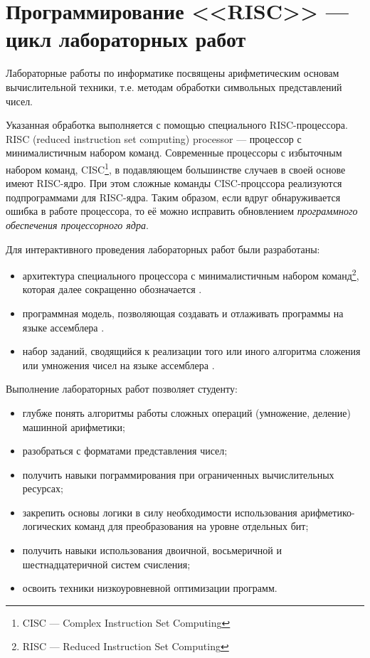 \chapter{Программирование <<RISC>> --- цикл лабораторных работ}

Лабораторные работы по информатике посвящены арифметическим основам вычислительной техники, т.е. методам обработки символьных представлений чисел.

Указанная обработка выполняется с помощью специального RISC-процессора. RISC (reduced instruction set computing) processor --- процессор с минималистичным набором команд. Современные процессоры с избыточным набором команд, CISC\footnote{CISC --- Complex Instruction Set Computing}, в подавляющем большинстве случаев в своей основе имеют RISC-ядро. При этом сложные команды CISC-процссора реализуются подпрограммами для RISC-ядра. Таким образом, если вдруг обнаруживается ошибка в работе процессора, то её можно исправить обновлением \emph{программного обеспечения процессорного ядра}.
    
Для интерактивного проведения лабораторных работ были разработаны:
\begin{itemize}
    \item архитектура специального процессора с минималистичным набором команд\footnote{RISC --- Reduced Instruction Set Computing}, которая далее сокращенно обозначается \MyProc.
    
    \item программная модель, позволяющая создавать и отлаживать программы на языке ассемблера \MyProc.
    
    \item набор заданий, сводящийся к реализации того или иного алгоритма сложения или умножения чисел на языке ассемблера \MyProc.
\end{itemize}

Выполнение лабораторных работ позволяет студенту:
\begin{itemize}
    \item глубже понять алгоритмы работы сложных операций (умножение, деление) машинной арифметики;
    
    \item разобраться с форматами представления чисел;
    
    \item получить навыки пограммирования при ограниченных вычислительных ресурсах;
    
    \item закрепить основы логики в силу необходимости использования арифметико-логических команд для преобразования на уровне отдельных бит;
    
    \item получить навыки использования двоичной, восьмеричной и шестнадцатеричной систем счисления;
    
    \item освоить техники низкоуровневной оптимизации программ.
\end{itemize}

